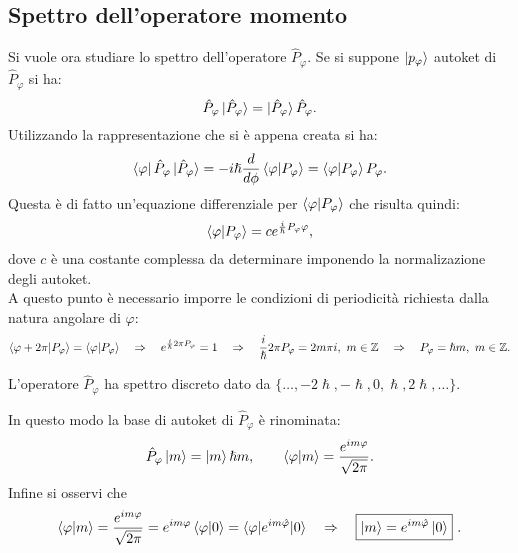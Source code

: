\subsection{Spettro dell'operatore momento}
Si vuole ora studiare lo spettro dell'operatore $\hat P_\varphi$. Se si suppone $\ket{p_\varphi}$ autoket di $\hat P_\varphi$ si ha:
\begin{equation*}
    \hat P_\varphi\ket{\hat P_\varphi}=\ket{\hat P_\varphi}\hat P_\varphi.
\end{equation*}
Utilizzando la rappresentazione che si è appena creata si ha:
\begin{equation*}
    \bra{\varphi}\hat P_\varphi\ket{\hat P_\varphi}=-i\hslash\frac{d}{d\phi}\braket{\varphi|P_\varphi}=\braket{\varphi|P_\varphi}P_\varphi.
\end{equation*}
Questa è di fatto un'equazione differenziale per $\braket{\varphi|P_\varphi}$ che risulta quindi:
\begin{equation*}
    \braket{\varphi|P_\varphi}=ce^{\frac{i}{\hslash}P_\varphi\varphi},
\end{equation*}
dove $c$ è una costante complessa da determinare imponendo la normalizazione degli autoket.\\
A questo punto è necessario imporre le condizioni di periodicità richiesta dalla natura angolare di $\varphi$:
\begin{equation*}
    \braket{\varphi+2\pi|P_\varphi}=\braket{\varphi|P_\varphi}\quad\Rightarrow\quad e^{\frac{i}{\hslash}2\pi P_\varphi}=1\quad\Rightarrow\quad\frac{i}{\hslash}2\pi P_\varphi=2m\pi i,\ m\in\mathbb{Z}\quad\Rightarrow\quad P_\varphi=\hslash m,\ m\in\mathbb{Z}.
\end{equation*}
\begin{proposition}
    L'operatore $\hat P_\varphi$ ha spettro discreto dato da $\{\dots,-2\hslash,-\hslash,0,\hslash,2\hslash,\dots\}$.
\end{proposition}
In questo modo la base di autoket di $\hat P_\varphi$ è rinominata:
\begin{equation*}
    \hat P_\varphi\ket{m}=\ket{m}\hslash m,\qquad\braket{\varphi|m}=\frac{e^{im\varphi}}{\sqrt{2\pi}}.
\end{equation*}
Infine si osservi che
\begin{equation*}
    \braket{\varphi|m}=\frac{e^{im\varphi}}{\sqrt{2\pi}}=e^{im\varphi}\braket{\varphi|0}=\braket{\varphi|e^{im\hat\varphi}|0}\quad\Rightarrow\quad\boxed{\ket{m}=e^{im\hat\varphi}\ket{0}}\ .
\end{equation*}

